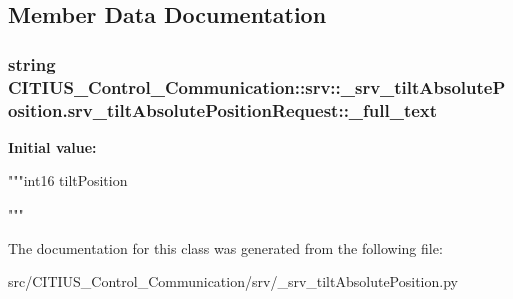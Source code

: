 \subsection{\-Member \-Data \-Documentation}
\hypertarget{class_c_i_t_i_u_s___control___communication_1_1srv_1_1__srv__tilt_absolute_position_1_1srv__tilt_absolute_position_request_ade4a18fd131ee7510318b0376857df87}{
\subsubsection[{\-\_\-full\-\_\-text}]{\setlength{\rightskip}{0pt plus 5cm}string \-C\-I\-T\-I\-U\-S\-\_\-\-Control\-\_\-\-Communication\-::srv\-::\-\_\-srv\-\_\-tilt\-Absolute\-Position.\-srv\-\_\-tilt\-Absolute\-Position\-Request\-::\-\_\-full\-\_\-text}}\label{class_c_i_t_i_u_s___control___communication_1_1srv_1_1__srv__tilt_absolute_position_1_1srv__tilt_absolute_position_request_ade4a18fd131ee7510318b0376857df87}
{\bfseries \-Initial value\-:}
\begin{DoxyCode}
"""int16 tiltPosition

"""
\end{DoxyCode}


\-The documentation for this class was generated from the following file\-:\begin{DoxyCompactItemize}
\item 
src/\-C\-I\-T\-I\-U\-S\-\_\-\-Control\-\_\-\-Communication/srv/\-\_\-srv\-\_\-tilt\-Absolute\-Position.\-py\end{DoxyCompactItemize}
